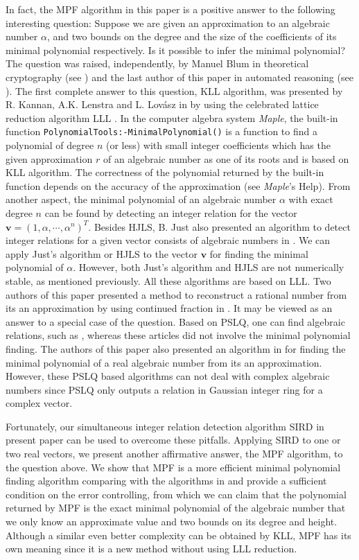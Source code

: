 \documentclass{sig-alternate}
\numberwithin{theorem}{section} \numberwithin{equation}{section}
\begin{document}
In fact, the MPF algorithm in this paper is a  positive answer to
the following interesting question: Suppose we are given an
approximation to an algebraic number $\alpha$, and two bounds on the
degree and  the size of the coefficients of its minimal polynomial
respectively. Is it possible to infer the minimal polynomial? The
question was raised, independently, by Manuel Blum  in theoretical
cryptography (see \cite{KLL1984,KLL1988}) and the last author of
this paper  in automated reasoning (see \cite{YZH1996}). The first
complete answer to this question, KLL algorithm, was presented by R.
Kannan, A.K. Lenstra and L. Lov{\'a}sz in \cite{KLL1984, KLL1988} by
using the celebrated lattice reduction algorithm LLL \cite{LLL1982}.
In the computer algebra system \emph{Maple}, the built-in function
\texttt{PolynomialTools:-MinimalPolynomial()} is a function to find
a polynomial of degree $n$ (or less) with small integer coefficients
which has the given approximation $r$ of an algebraic number as one
of its roots and is based on  KLL algorithm. The correctness of the
polynomial returned by the built-in function
depends on the accuracy of the approximation (see \emph{Maple}'s Help). From another aspect, the minimal
polynomial of an algebraic number $\alpha$ with exact degree $n$ can
be found by detecting an integer relation for the vector $\mathbf{v}
= (1, \alpha, \cdots, \alpha^n)^T$. Besides
HJLS, B. Just also presented an algorithm to detect integer relations for
a given vector consists of algebraic numbers in \cite{Jus1989}. We
can apply Just's algorithm or  HJLS  to the vector $\mathbf{v}$ for
finding the minimal polynomial of $\alpha$.
However, both Just's algorithm and HJLS are not numerically stable, as mentioned previously. All these
algorithms are based on LLL. Two authors of this paper presented a
method to reconstruct a rational number from its an approximation by
using continued fraction in \cite{ZF2007}. It may be viewed as an
answer to a special case of  the question.
Based on PSLQ, one can find algebraic relations, such as \cite{BC1999, BL2000, BHM2002, BBK2006}, whereas these
articles did not involve the minimal polynomial finding. The authors
of this paper also presented an algorithm in \cite{QFC2009} for
finding the minimal polynomial of a real algebraic number from its
an approximation. However, these PSLQ based algorithms can not deal
with complex algebraic numbers since PSLQ only outputs  a relation
in Gaussian integer ring
 for a complex vector. 


Fortunately, our simultaneous integer relation detection algorithm
SIRD in present paper can be used to overcome these pitfalls.
Applying SIRD to one or two real vectors, we present another
affirmative answer, the MPF algorithm, to the question above. We
show that MPF is a more efficient minimal polynomial finding
algorithm comparing with the algorithms in \cite{Jus1989,QFC2009}
and provide a sufficient condition on the error controlling, from
which we can claim that the
polynomial returned by MPF is the exact minimal polynomial of the algebraic number that we
only know an approximate value and two bounds on its degree and
height. Although a  similar even better complexity can be obtained
by KLL, MPF has its own meaning since it is a new method without using LLL reduction.
\end{document}
